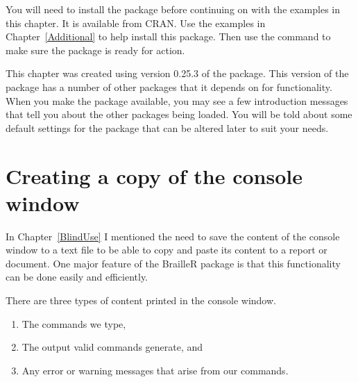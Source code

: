  
You will need to install the  package before continuing on with the examples in this chapter. It is available from CRAN. Use the examples in Chapter~\ref{Additional} to help install this package. Then use the  command to make sure the package is ready for action. 
\begin{knitrout}
\color{fgcolor}\begin{kframe}
\begin{alltt}
\hlstd{> }
\end{alltt}


{\ttfamily\noindent\itshape\color{messagecolor}{The BrailleR.View,\ \ option is set to FALSE.}}

{\ttfamily\noindent\itshape\color{messagecolor}{\\Attaching package: 'BrailleR'}}

{\ttfamily\noindent\itshape\color{messagecolor}{The following objects are masked from 'package:graphics':

\ \ \ \ boxplot, hist}}

{\ttfamily\noindent\itshape\color{messagecolor}{The following object is masked from 'package:utils':

\ \ \ \ history}}\end{kframe}
\end{knitrout}
This chapter was created using version 0.25.3 of the  package. This version of the package has a number of other packages that it depends on for functionality. When you make the  package available, you may see a few introduction messages that tell you about the other packages being loaded. You will be told about some default settings for the package that can be altered later to suit your needs. 
 
 
\section{Creating a copy of the \R{} console window}\label{CreateCopyConsole} 
 
In Chapter~\ref{BlindUse} I mentioned the need to save the content of the console window to a text file to be able to copy and paste its content to a report or document. One major feature of the BrailleR package is that this functionality can be done easily and efficiently. 
 
There are three types of content printed in the console window.\begin{enumerate} 
\item The commands we type, 
\item The output valid commands generate, and 
\item Any error or warning messages that arise from our commands. 
\end{enumerate} 
 
